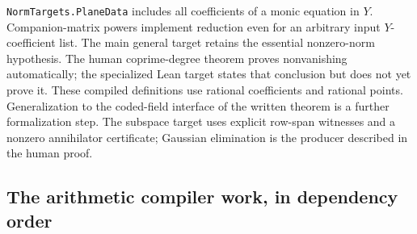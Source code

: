 \texttt{NormTargets.PlaneData} includes all coefficients of a monic
equation in $Y$. Companion-matrix powers implement reduction even for
an arbitrary input $Y$-coefficient list. The main general target retains
the essential nonzero-norm hypothesis. The human coprime-degree theorem
proves nonvanishing automatically; the specialized Lean target states
that conclusion but does not yet prove it. These compiled definitions
use rational coefficients and rational points. Generalization to the
coded-field interface of the written theorem is a further formalization
step. The subspace target uses
explicit row-span witnesses and a nonzero annihilator certificate;
Gaussian elimination is the producer described in the human proof.

\subsection{The arithmetic compiler work, in dependency order}

